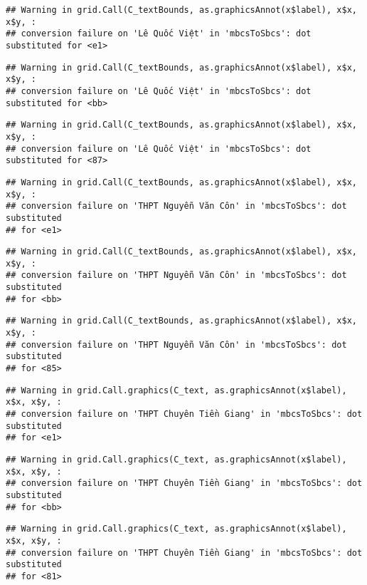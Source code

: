 \documentclass[
]{article}
\begin{document}
\begin{verbatim}
## Warning in grid.Call(C_textBounds, as.graphicsAnnot(x$label), x$x, x$y, :
## conversion failure on 'Lê Quốc Việt' in 'mbcsToSbcs': dot substituted for <e1>
\end{verbatim}

\begin{verbatim}
## Warning in grid.Call(C_textBounds, as.graphicsAnnot(x$label), x$x, x$y, :
## conversion failure on 'Lê Quốc Việt' in 'mbcsToSbcs': dot substituted for <bb>
\end{verbatim}

\begin{verbatim}
## Warning in grid.Call(C_textBounds, as.graphicsAnnot(x$label), x$x, x$y, :
## conversion failure on 'Lê Quốc Việt' in 'mbcsToSbcs': dot substituted for <87>
\end{verbatim}

\begin{verbatim}
## Warning in grid.Call(C_textBounds, as.graphicsAnnot(x$label), x$x, x$y, :
## conversion failure on 'THPT Nguyễn Văn Côn' in 'mbcsToSbcs': dot substituted
## for <e1>
\end{verbatim}

\begin{verbatim}
## Warning in grid.Call(C_textBounds, as.graphicsAnnot(x$label), x$x, x$y, :
## conversion failure on 'THPT Nguyễn Văn Côn' in 'mbcsToSbcs': dot substituted
## for <bb>
\end{verbatim}

\begin{verbatim}
## Warning in grid.Call(C_textBounds, as.graphicsAnnot(x$label), x$x, x$y, :
## conversion failure on 'THPT Nguyễn Văn Côn' in 'mbcsToSbcs': dot substituted
## for <85>
\end{verbatim}

\begin{verbatim}
## Warning in grid.Call.graphics(C_text, as.graphicsAnnot(x$label), x$x, x$y, :
## conversion failure on 'THPT Chuyên Tiền Giang' in 'mbcsToSbcs': dot substituted
## for <e1>
\end{verbatim}

\begin{verbatim}
## Warning in grid.Call.graphics(C_text, as.graphicsAnnot(x$label), x$x, x$y, :
## conversion failure on 'THPT Chuyên Tiền Giang' in 'mbcsToSbcs': dot substituted
## for <bb>
\end{verbatim}

\begin{verbatim}
## Warning in grid.Call.graphics(C_text, as.graphicsAnnot(x$label), x$x, x$y, :
## conversion failure on 'THPT Chuyên Tiền Giang' in 'mbcsToSbcs': dot substituted
## for <81>
\end{verbatim}
\end{document}
